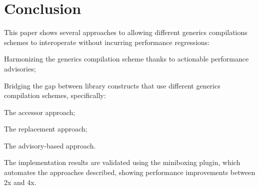 \vspace{-1.0em}

\section{Conclusion}

\vspace{-0.5em}

This paper shows several approaches to allowing different generics compilations schemes to interoperate without incurring performance regressions:

\begin{compactitem}
\item Harmonizing the generics compilation scheme thanks to actionable performance advisories;
\item Bridging the gap between library constructs that use different generics compilation schemes, specifically:
  \begin{compactitem}
    \item The accessor approach;
    \item The replacement approach;
    \item The advisory-based approach.
  \end{compactitem}
\end{compactitem}

The implementation results are validated using the miniboxing plugin, which automates the approaches described, showing performance improvements between 2x and 4x.

\vspace{-1.2em}
